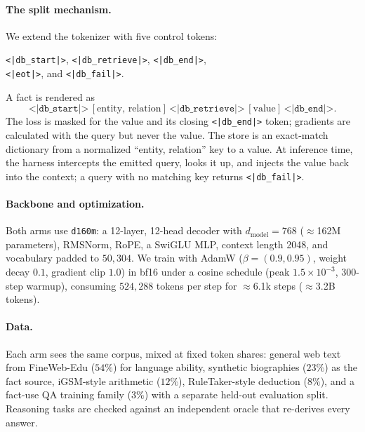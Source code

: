 \documentclass{article}
\begin{document}
\paragraph{The split mechanism.} We extend the tokenizer with five control tokens:
\begin{center}
\texttt{<|db\_start|>}, \texttt{<|db\_retrieve|>}, \texttt{<|db\_end|>},\\
\texttt{<|eot|>}, and \texttt{<|db\_fail|>}.
\end{center}
A fact is rendered as
\[
\texttt{<|db\_start|>}\,[\text{entity, relation}]\,\texttt{<|db\_retrieve|>}\,[\text{value}]\,\texttt{<|db\_end|>}.
\]
The loss is masked for the value and its closing \texttt{<|db\_end|>} token; gradients are calculated with the query but never the value. The store is an exact-match dictionary from a normalized ``entity, relation'' key to a value. At inference time, the harness intercepts the emitted query, looks it up, and injects the value back into the context; a query with no matching key returns \texttt{<|db\_fail|>}.

\paragraph{Backbone and optimization.} Both arms use \texttt{d160m}: a 12-layer, 12-head decoder with $d_{\text{model}}{=}768$ ($\approx$162M parameters), RMSNorm, RoPE, a SwiGLU MLP, context length 2048, and vocabulary padded to $50{,}304$. We train with AdamW ($\beta{=}(0.9,0.95)$, weight decay $0.1$, gradient clip $1.0$) in bf16 under a cosine schedule (peak $1.5\times10^{-3}$, 300-step warmup), consuming $524{,}288$ tokens per step for $\approx$6.1k steps ($\approx$3.2B tokens).

\paragraph{Data.} Each arm sees the same corpus, mixed at fixed token shares: general web text from FineWeb-Edu \citep{penedo2024fineweb} ($54\%$) for language ability, synthetic biographies \citep{allenzhu2023storage} ($23\%$) as the fact source, iGSM-style arithmetic \citep{ye2024igsm} ($12\%$), RuleTaker-style deduction \citep{clark2020ruletaker} ($8\%$), and a fact-use QA training family ($3\%$) with a separate held-out evaluation split. Reasoning tasks are checked against an independent oracle that re-derives every answer.
\end{document}
